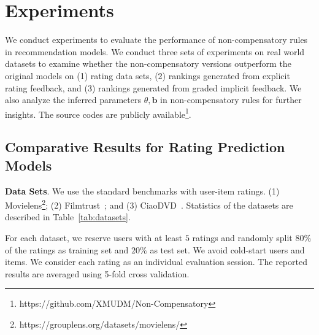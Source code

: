 \documentclass[letterpaper]{article} %
\begin{document}
\section{Experiments}\label{sec:experiment}
We conduct experiments to evaluate the performance of non-compensatory rules in recommendation models. We conduct three sets of experiments on real world datasets to examine whether the non-compensatory versions outperform the original models on (1) rating data sets, (2) rankings generated from explicit rating feedback, and (3) rankings generated from graded implicit feedback. We also analyze the inferred parameters $\theta,\mathbf{b}$ in non-compensatory rules for further insights. The source codes are publicly available\footnote{https://github.com/XMUDM/Non-Compensatory}.

\subsection{Comparative Results for Rating Prediction Models}

\textbf{Data Sets}. We use the standard benchmarks with user-item ratings. (1) Movielens\footnote{https://grouplens.org/datasets/movielens/}; (2) Filmtrust~\cite{Guo2013Novel}; and (3) CiaoDVD~\cite{Guo2014ETAF}. Statistics of the datasets are described in Table~\ref{tab:datasets}. 

For each dataset, we reserve users with at least $5$ ratings and randomly split $80\%$ of the ratings as training set and $20\%$ as test set. We avoid cold-start users and items. We consider each rating as an individual evaluation session. The reported results are averaged using 5-fold cross validation. 
\begin{table}[htp]
\caption{Statistics of Datasets with ratings}
\small
\centering
{}
\label{tab:datasets}
\end{table}
\end{document}
